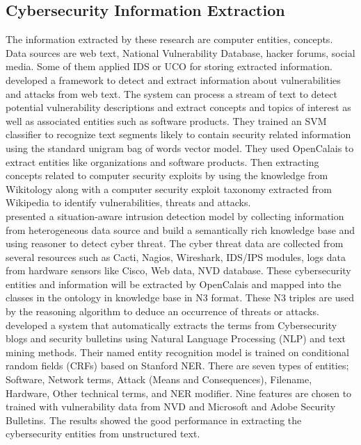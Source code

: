 \subsection{Cybersecurity Information Extraction}
\label{cybersecuie}
The information extracted by these research are computer entities, concepts. Data sources are web text, National Vulnerability Database, hacker forums, social media. Some of them applied IDS or UCO for storing extracted information. \cite{mulwad2011} developed a framework to detect and extract information about vulnerabilities and attacks from web text. The system can process a stream of text to detect potential vulnerability descriptions and extract concepts and topics of interest as well as associated entities such as software products. They trained an SVM classifier to recognize text segments likely to contain security related information using the standard unigram bag of words vector model. They used OpenCalais to extract entities like organizations and software products. Then extracting concepts related to computer security exploits by using the knowledge from Wikitology along with a computer security exploit taxonomy extracted from Wikipedia to identify vulnerabilities, threats and attacks.\\
\indent \cite{more2012} presented a situation-aware intrusion detection model by collecting information from heterogeneous data source and build a semantically rich knowledge base and using reasoner to detect cyber threat. The cyber threat data are collected from several resources such as Cacti, Nagios, Wireshark, IDS/IPS modules, logs data from hardware sensors like Cisco, Web data, NVD database. These cybersecurity entities and information will be extracted by OpenCalais and mapped into the classes in the ontology in knowledge base in N3 format. These N3 triples are used by the reasoning algorithm to deduce an occurrence of threats or attacks. \\
\indent \cite{lal2013} developed a system that automatically extracts the terms from Cybersecurity blogs and security bulletins using Natural Language Processing (NLP) and text mining methods. Their named entity recognition model is trained on conditional random fields (CRFs) based on Stanford NER. There are seven types of entities; Software, Network terms, Attack (Means and Consequences), Filename, Hardware, Other technical terms, and NER modifier. Nine features are chosen to trained with vulnerability data from NVD and Microsoft and Adobe Security Bulletins. The results showed the good performance in extracting the cybersecurity entities from unstructured text.\\
